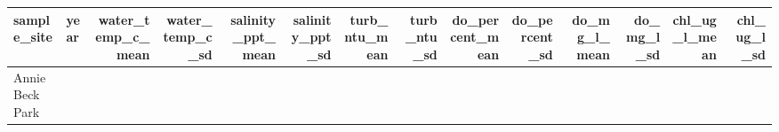 \documentclass[
]{article}
\begin{document}
\begin{longtable}[]{@{}llrrrrrrrrrrrr@{}}
\toprule
\begin{minipage}[b]{0.11\columnwidth}\raggedright
sample\_site\strut
\end{minipage} & \begin{minipage}[b]{0.02\columnwidth}\raggedright
year\strut
\end{minipage} & \begin{minipage}[b]{0.05\columnwidth}\raggedleft
water\_temp\_c\_mean\strut
\end{minipage} & \begin{minipage}[b]{0.05\columnwidth}\raggedleft
water\_temp\_c\_sd\strut
\end{minipage} & \begin{minipage}[b]{0.05\columnwidth}\raggedleft
salinity\_ppt\_mean\strut
\end{minipage} & \begin{minipage}[b]{0.05\columnwidth}\raggedleft
salinity\_ppt\_sd\strut
\end{minipage} & \begin{minipage}[b]{0.04\columnwidth}\raggedleft
turb\_ntu\_mean\strut
\end{minipage} & \begin{minipage}[b]{0.04\columnwidth}\raggedleft
turb\_ntu\_sd\strut
\end{minipage} & \begin{minipage}[b]{0.05\columnwidth}\raggedleft
do\_percent\_mean\strut
\end{minipage} & \begin{minipage}[b]{0.04\columnwidth}\raggedleft
do\_percent\_sd\strut
\end{minipage} & \begin{minipage}[b]{0.04\columnwidth}\raggedleft
do\_mg\_l\_mean\strut
\end{minipage} & \begin{minipage}[b]{0.03\columnwidth}\raggedleft
do\_mg\_l\_sd\strut
\end{minipage} & \begin{minipage}[b]{0.04\columnwidth}\raggedleft
chl\_ug\_l\_mean\strut
\end{minipage} & \begin{minipage}[b]{0.04\columnwidth}\raggedleft
chl\_ug\_l\_sd\strut
\end{minipage}\tabularnewline
\midrule
\endhead
\begin{minipage}[t]{0.11\columnwidth}\raggedright
Annie Beck Park\strut
\end{minipage} & \begin{minipage}[t]{0.02\columnwidth}\raggedright

\end{minipage}
\end{longtable}
\end{document}
